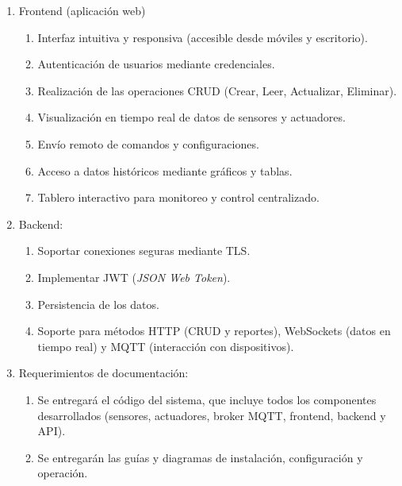 \begin{enumerate}
      \item Frontend (aplicación web)
            \begin{enumerate}
                  \item Interfaz intuitiva y responsiva (accesible desde móviles y escritorio).
                  \item Autenticación de usuarios mediante credenciales.
                  \item Realización de las operaciones CRUD (Crear, Leer, Actualizar, Eliminar).
                  \item Visualización en tiempo real de datos de sensores y actuadores.
                  \item Envío remoto de comandos y configuraciones.
                  \item Acceso a datos históricos mediante gráficos y tablas.
                  \item Tablero interactivo para monitoreo y control centralizado.
            \end{enumerate}

      \item Backend:
            \begin{enumerate}
                  \item Soportar conexiones seguras mediante TLS.
                  \item Implementar JWT (\textit{JSON Web Token}).
                  \item Persistencia de los datos.
                  \item Soporte para métodos HTTP (CRUD y reportes), WebSockets (datos en tiempo real)
                        y MQTT (interacción con dispositivos).
            \end{enumerate}

      \item Requerimientos de documentación:
            \begin{enumerate}
                  \item Se entregará el código del sistema, que incluye todos los componentes
                        desarrollados (sensores, actuadores, broker MQTT, frontend, backend y API).
                  \item Se entregarán las guías y diagramas de instalación, configuración y operación.
            \end{enumerate}
\end{enumerate}


